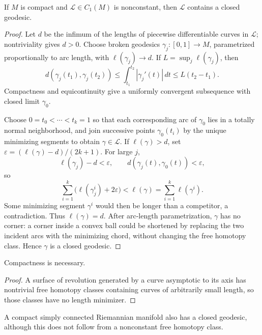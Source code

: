 \begin{theorem}
  \label{thm:dc-ch12-2-2}
  If $M$ is compact and $\mathcal L\in C_1(M)$ is nonconstant, then
  $\mathcal L$ contains a closed geodesic.
\end{theorem}
\begin{proof}
  \sketch
  Let $d$ be the infimum of the lengths of piecewise differentiable curves in
  $\mathcal L$; nontriviality gives $d>0$. Choose broken geodesics
  $\gamma_j:[0,1]\to M$, parametrized proportionally to arc length, with
  $\ell(\gamma_j)\to d$. If $L=\sup_j\ell(\gamma_j)$, then
  \[
    d(\gamma_j(t_1),\gamma_j(t_2))
    \leq \int_{t_1}^{t_2}|\gamma_j'(t)|\,dt
    \leq L(t_2-t_1).
  \]
  Compactness and equicontinuity give a uniformly convergent subsequence with
  closed limit $\gamma_0$.

  Choose $0=t_0<\cdots<t_k=1$ so that each corresponding arc of $\gamma_0$
  lies in a totally normal neighborhood, and join successive points
  $\gamma_0(t_i)$ by the unique minimizing segments to obtain
  $\gamma\in\mathcal L$. If $\ell(\gamma)>d$, set
  $\varepsilon=(\ell(\gamma)-d)/(2k+1)$. For large $j$,
  \[
    \ell(\gamma_j)-d<\varepsilon,
    \qquad d(\gamma_j(t),\gamma_0(t))<\varepsilon,
  \]
  so
  \[
    \sum_{i=1}^k\bigl(\ell(\gamma_j^i)+2\varepsilon\bigr)
    <\ell(\gamma)=\sum_{i=1}^k\ell(\gamma^i).
  \]
  Some minimizing segment $\gamma^i$ would then be longer than a competitor,
  a contradiction. Thus $\ell(\gamma)=d$. After arc-length parametrization,
  $\gamma$ has no corner: a corner inside a convex ball could be shortened by
  replacing the two incident arcs with the minimizing chord, without changing
  the free homotopy class. Hence $\gamma$ is a closed geodesic.
\end{proof}

\begin{remark}
  \label{rem:dc-ch12-2-3}
  Compactness is necessary.
\end{remark}
\begin{proof}

  \sketch
  A surface of revolution generated by a curve
  asymptotic to its axis has nontrivial free homotopy classes containing curves
  of arbitrarily small length, so those classes have no length minimizer.
\end{proof}

\begin{remark}
  \label{rem:dc-ch12-2-4}
  A compact simply connected Riemannian manifold also has a closed geodesic,
  although this does not follow from a nonconstant free homotopy class.
\end{remark}

